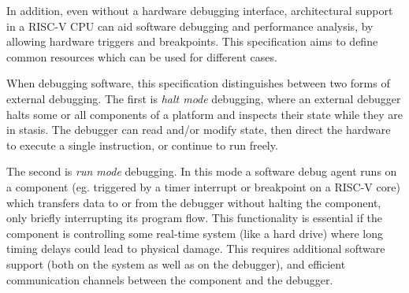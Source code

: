 \documentclass{article}
\begin{document}
In addition, even without a hardware debugging interface,
architectural support in a RISC-V CPU can aid software debugging and
performance analysis, by allowing hardware triggers and breakpoints.
This specification aims to define common resources which can be used
for different cases.

When debugging software, this specification distinguishes between two
forms of external debugging. The first is \emph{halt mode} debugging,
where an external debugger halts some or all components of a
platform and inspects their state while they are in stasis.
The debugger can read and/or modify state, then direct the hardware
to execute a single instruction, or continue to run freely.

The second is \emph{run mode} debugging. In this mode a software
debug agent runs on a component (eg.  triggered by a timer interrupt or breakpoint
on a RISC-V core) which transfers data to or from the debugger
without halting the component, only briefly interrupting its program flow.
This functionality is essential if the component is controlling some real-time system (like a
hard drive) where long timing delays could lead to physical damage.
This requires additional software support (both on the system as well as on the debugger),
and efficient communication channels between the component and the debugger.

\end{document}
